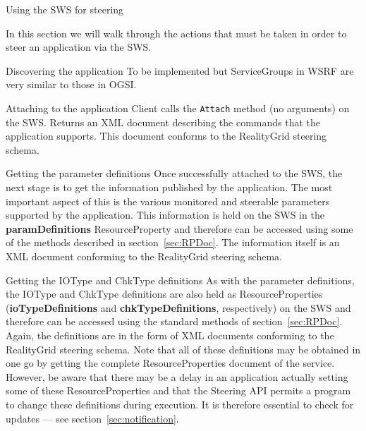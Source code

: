 \documentclass[a4paper]{article}
\begin{document}

\begin{section}{Using the SWS for steering}
\label{sec:sws_steering}

In this section we will walk through the actions that must be taken in
order to steer an application via the SWS.

\begin{subsection}{Discovering the application}
To be implemented but ServiceGroups in WSRF are very similar to those
in OGSI.
\end{subsection}

\begin{subsection}{Attaching to the application}
Client calls the \texttt{Attach} method (no arguments) on the SWS.
Returns an XML document describing the commands that the application
supports.  This document conforms to the RealityGrid steering schema.
\end{subsection}

\begin{subsection}{Getting the parameter definitions}
Once successfully attached to the SWS, the next stage is to get the
information published by the application.  The most important aspect
of this is the various monitored and steerable parameters supported by
the application.  This information is held on the SWS in the {\bf
paramDefinitions} ResourceProperty and therefore can be accessed using
some of the methods described in section~\ref{sec:RPDoc}.  The
information itself is an XML document conforming to the RealityGrid
steering schema.
\end{subsection}

\begin{subsection}{Getting the IOType and ChkType definitions}
As with the parameter definitions, the IOType and ChkType definitions
are also held as ResourceProperties ({\bf ioTypeDefinitions} and {\bf
chkTypeDefinitions}, respectively) on the SWS and therefore can be
accessed using the standard methods of section~\ref{sec:RPDoc}.
Again, the definitions are in the form of XML documents conforming to
the RealityGrid steering schema.  Note that all of these definitions
may be obtained in one go by getting the complete ResourceProperties
document of the service.  However, be aware that there may be a delay
in an application actually setting some of these ResourceProperties
and that the Steering API permits a program to change these
definitions during execution.  It is therefore essential to check for
updates --- see section~\ref{sec:notification}.
\end{subsection}


\end{section}
\end{document}
